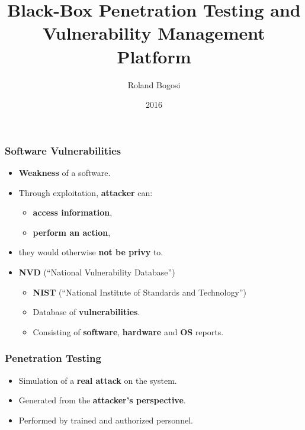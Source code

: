 \documentclass[aspectratio=169,xcolor={usenames,dvipsnames}]{beamer}
\title{Black-Box Penetration Testing and Vulnerability Management Platform}
\author{Roland Bogosi}
\date{2016}
\newcommand{\ispace}{\vspace{10pt}}
\begin{document}
	\frame{\titlepage}

\begin{frame}
	\frametitle{Software Vulnerabilities}
	
	\begin{itemize}
		\item \textbf{Weakness} of a software.
		\item Through exploitation, \textbf{attacker} can:
		\begin{itemize}
			\item \textbf{access information},
			\item \textbf{perform an action},
		\end{itemize}
		\item they would otherwise \textbf{not be privy} to.
	\end{itemize}
	
	\ispace
	
	\begin{itemize}
		\item \textbf{NVD} (``National Vulnerability Database'')
		\begin{itemize}
			\item \textbf{NIST} (``National Institute of Standards and Technology'')
			\item Database of \textbf{vulnerabilities}.
			\item Consisting of \textbf{software}, \textbf{hardware} and \textbf{OS} reports.
		\end{itemize}
	\end{itemize}
\end{frame}

\begin{frame}
	\frametitle{Penetration Testing}
	
	\begin{itemize}
		\item Simulation of a \textbf{real attack} on the system.
		\item Generated from the \textbf{attacker's perspective}.
		\item Performed by trained and authorized personnel.
	\end{itemize}
\end{frame}
\end{document}
